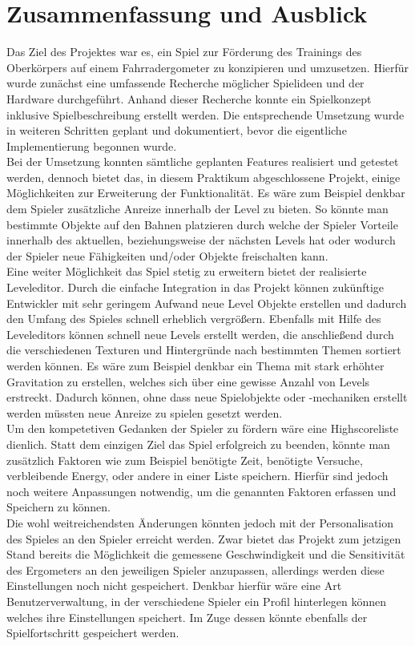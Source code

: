 \chapter{Zusammenfassung und Ausblick}
Das Ziel des Projektes war es, ein Spiel zur Förderung des Trainings des Oberkörpers auf einem Fahrradergometer zu konzipieren und umzusetzen. Hierfür wurde zunächst eine umfassende Recherche möglicher Spielideen und der Hardware durchgeführt. Anhand dieser Recherche konnte ein Spielkonzept inklusive Spielbeschreibung erstellt werden. Die entsprechende Umsetzung wurde in weiteren Schritten geplant und dokumentiert, bevor die eigentliche Implementierung begonnen wurde. \\
Bei der Umsetzung konnten sämtliche geplanten Features realisiert und getestet werden, dennoch bietet das, in diesem Praktikum abgeschlossene Projekt, einige Möglichkeiten zur Erweiterung der Funktionalität. Es wäre zum Beispiel denkbar dem Spieler zusätzliche Anreize innerhalb der Level zu bieten. So könnte man bestimmte Objekte auf den Bahnen platzieren durch welche der Spieler Vorteile innerhalb des aktuellen, beziehungsweise der nächsten Levels hat oder wodurch der Spieler neue Fähigkeiten und/oder Objekte freischalten kann. \\
Eine weiter Möglichkeit das Spiel stetig zu erweitern bietet der realisierte Leveleditor. Durch die einfache Integration in das Projekt können zukünftige Entwickler mit sehr geringem Aufwand neue Level Objekte erstellen und dadurch den Umfang des Spieles schnell erheblich vergrößern. Ebenfalls mit Hilfe des Leveleditors können schnell neue Levels erstellt werden, die anschließend durch die verschiedenen Texturen und Hintergründe nach bestimmten Themen sortiert werden können. Es wäre zum Beispiel denkbar ein Thema mit stark erhöhter Gravitation zu erstellen, welches sich über eine gewisse Anzahl von Levels erstreckt. Dadurch können, ohne dass neue Spielobjekte oder -mechaniken erstellt werden müssten neue Anreize zu spielen gesetzt werden.\\
Um den kompetetiven Gedanken der Spieler zu fördern wäre eine Highscoreliste dienlich. Statt dem einzigen Ziel das Spiel erfolgreich zu beenden, könnte man zusätzlich Faktoren wie zum Beispiel benötigte Zeit, benötigte Versuche, verbleibende Energy, oder andere in einer Liste speichern. Hierfür sind jedoch noch weitere Anpassungen notwendig, um die genannten Faktoren erfassen und Speichern zu können.\\
Die wohl weitreichendsten Änderungen könnten jedoch mit der Personalisation des Spieles an den Spieler erreicht werden. Zwar bietet das Projekt zum jetzigen Stand bereits die Möglichkeit die gemessene Geschwindigkeit und die Sensitivität des Ergometers an den jeweiligen Spieler anzupassen, allerdings werden diese Einstellungen noch nicht gespeichert. Denkbar hierfür wäre eine Art Benutzerverwaltung, in der verschiedene Spieler ein Profil hinterlegen können welches ihre Einstellungen speichert. Im Zuge dessen könnte ebenfalls der Spielfortschritt gespeichert werden. \\
